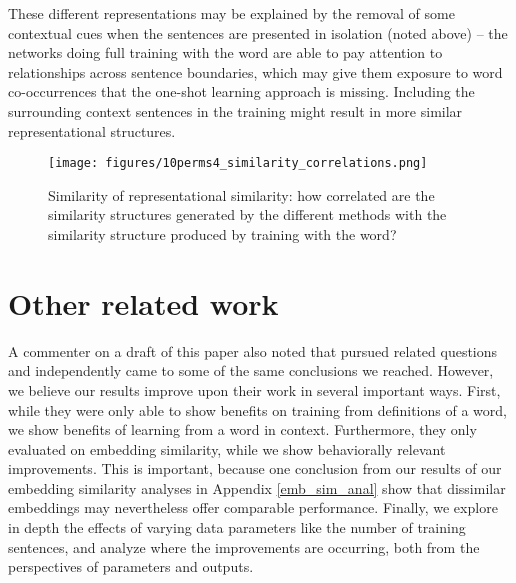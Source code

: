 \documentclass{article}
\begin{document}
These different representations may be explained by the removal of some contextual cues when the sentences are presented in isolation (noted above) -- the networks doing full training with the word are able to pay attention to relationships across sentence boundaries, which may give them exposure to word co-occurrences that the one-shot learning approach is missing. Including the surrounding context sentences in the training might result in more similar representational structures. \par
\begin{figure}[H]
\centering
\texttt{[image: figures/10perms4\_similarity\_correlations.png]}
\caption{Similarity of representational similarity: how correlated are the similarity structures generated by the different methods with the similarity structure produced by training with the word?}
\label{RSA_results}
\end{figure}

\section{Other related work} \label{Herbelot}
A commenter on a draft of this paper also noted that \cite{Herbelot2017} pursued related questions and independently came to some of the same conclusions we reached. However, we believe our results improve upon their work in several important ways. First, while they were only able to show benefits on training from definitions of a word, we show benefits of learning from a word in context. Furthermore, they only evaluated on embedding similarity, while we show behaviorally relevant improvements. This is important, because one conclusion from our results of our embedding similarity analyses in Appendix \ref{emb_sim_anal} show that dissimilar embeddings may nevertheless offer comparable performance. Finally, we explore in depth the effects of varying data parameters like the number of training sentences, and analyze where the improvements are occurring, both from the perspectives of parameters and outputs. \par 
\end{document}
